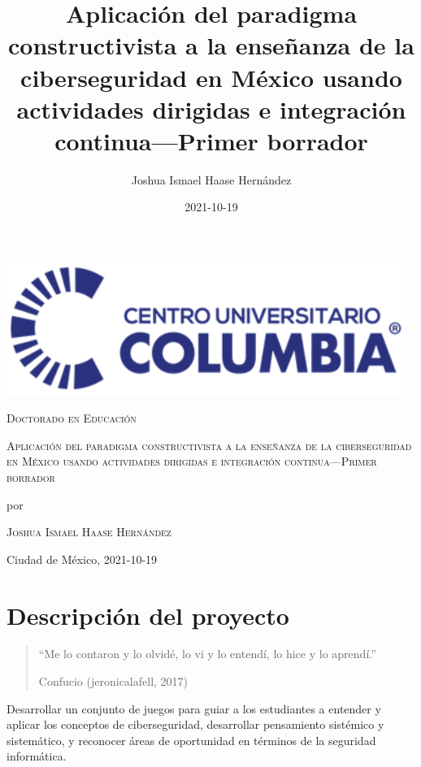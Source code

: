 \documentclass[
  12,
]{scrartcl}
\title{Aplicación del paradigma constructivista a la enseñanza de la
ciberseguridad en México usando actividades dirigidas e integración
continua---Primer borrador}
\author{Joshua Ismael Haase Hernández}
\date{2021-10-19}
\begin{document}
\begin{titlepage}
 \begin{addmargin}[-1.5cm]{-1cm}
	\centering
        \includegraphics[width=13cm]{uco.png}\par
        \vspace{2\baselineskip}
        {\LARGE \textsc{Doctorado en Educación}\par}
        \vspace{2\baselineskip}
        {\Huge \textsc{Aplicación del paradigma constructivista a la
enseñanza de la ciberseguridad en México usando actividades dirigidas e
integración continua---Primer borrador}\par}
        por\par
                {\Large\textsc{Joshua Ismael Haase Hernández}\par}
                \vspace{2\baselineskip}
        \vfill
        {\Large Ciudad de México, 2021-10-19\par}
 \end{addmargin}
\end{titlepage}

\renewcommand*\contentsname{Contenido}
{
\setcounter{tocdepth}{3}
\tableofcontents
}
\newpage

\hypertarget{descripciuxf3n-del-proyecto}{%
\section{Descripción del proyecto}\label{descripciuxf3n-del-proyecto}}

\begin{quote}
``Me lo contaron y lo olvidé, lo vi y lo entendí, lo hice y lo
aprendí.''

Confucio (jeronicalafell, 2017)
\end{quote}

Desarrollar un conjunto de juegos para guiar a los estudiantes a
entender y aplicar los conceptos de ciberseguridad, desarrollar
pensamiento sistémico y sistemático, y reconocer áreas de oportunidad en
términos de la seguridad informática.
\end{document}
